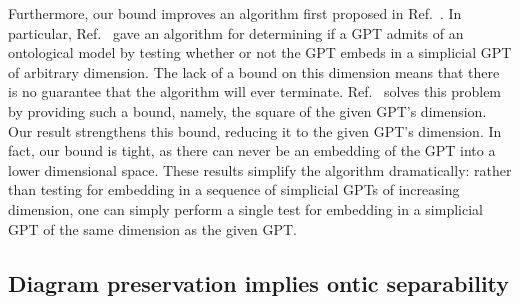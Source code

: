 \documentclass[10pt,twocolumn,aps,groupedaddress,nofootinbib]{revtex4}
\begin{document}
Furthermore, our bound improves an algorithm first proposed in Ref.~\cite{schmid2019characterization}.
In particular,  Ref.~\cite{schmid2019characterization} gave an algorithm for determining if a GPT admits of an ontological model by testing whether or not the GPT embeds in a simplicial GPT of arbitrary dimension.
The lack of a bound on this dimension means that there is no guarantee that the algorithm will ever terminate.
Ref.~\cite{gitton2020solvable} solves this problem by providing such a bound, namely, the square of the given GPT's dimension. Our result strengthens this bound, reducing it to the given GPT's dimension. In fact, our bound is tight, as there can never be an embedding of the GPT into a lower dimensional space.
These results simplify the algorithm dramatically: rather than testing for embedding in a sequence of simplicial GPTs of increasing dimension, one can simply perform a single test for embedding in a simplicial GPT of the same dimension as the given GPT.



\subsection{Diagram preservation implies ontic separability}\label{onticseparability}
\end{document}
